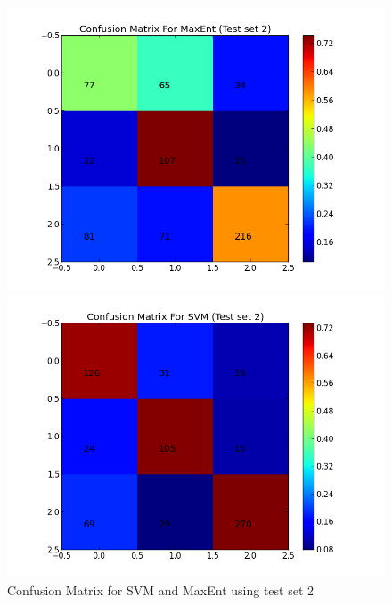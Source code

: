 \begin{figure}[htb]
	\centering
	\begin{minipage}{.45\linewidth}
		\includegraphics[width=\linewidth]{../img/plots/analysis/maxent_confusion_matrix_best_diff_test.png}
	\end{minipage}
	\hspace{0.05\linewidth}
	\begin{minipage}{.45\linewidth}
		\includegraphics[width=\linewidth]{../img/plots/analysis/svm_confusion_matrix_best_diff_test.png}
	\end{minipage}
	\label{fig:best_result_confusion_testset2}
	\caption[Confusion Matrix for SVM and MaxEnt using test set 2]{Confusion Matrix for SVM and MaxEnt using test set 2}
\end{figure}




